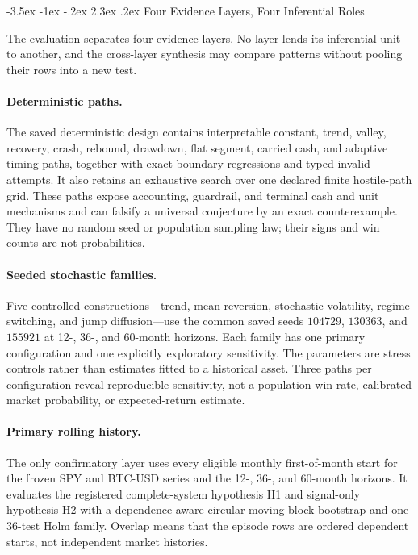 \documentclass[12pt,a4paper,oneside]{report}
\makeatletter
\renewcommand\section{\@startsection{section}{1}{\z@}%
  {-3.5ex \@plus -1ex \@minus -.2ex}%
  {2.3ex \@plus .2ex}%
  {\normalfont\fontsize{14}{17}\selectfont\bfseries}}
\makeatother
\begin{document}
\section{Four Evidence Layers, Four Inferential Roles}
\label{sec:method-evidence-layers}

The evaluation separates four evidence layers. No layer lends its inferential
unit to another, and the cross-layer synthesis may compare patterns without
pooling their rows into a new test.

\paragraph{Deterministic paths.}
The saved deterministic design contains interpretable constant, trend,
valley, recovery, crash, rebound, drawdown, flat segment, carried cash, and
adaptive timing paths, together with exact boundary regressions and typed
invalid attempts. It also retains an exhaustive search over one declared
finite hostile-path grid. These paths expose accounting, guardrail, and
terminal cash and unit mechanisms and can falsify a universal conjecture by an
exact counterexample. They have no random seed or population sampling law;
their signs and win counts are not probabilities.

\paragraph{Seeded stochastic families.}
Five controlled constructions---trend, mean reversion, stochastic volatility,
regime switching, and jump diffusion---use the common saved seeds
$104729$, $130363$, and $155921$ at 12-, 36-, and 60-month horizons. Each
family has one primary configuration and one explicitly exploratory
sensitivity. The parameters are stress controls rather than estimates fitted
to a historical asset. Three paths per configuration reveal reproducible
sensitivity, not a population win rate, calibrated market probability, or
expected-return estimate.

\paragraph{Primary rolling history.}
The only confirmatory layer uses every eligible monthly first-of-month start
for the frozen SPY and BTC-USD series and the 12-, 36-, and 60-month horizons.
It evaluates the registered complete-system hypothesis H1 and signal-only
hypothesis H2 with a dependence-aware circular moving-block bootstrap and one
36-test Holm family. Overlap means that the episode rows are ordered dependent
starts, not independent market histories.
\end{document}
